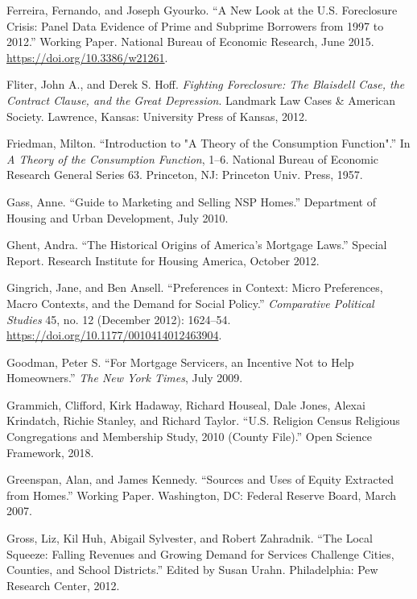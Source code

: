 \documentclass[12pt,oneside]{psthesis}
\begin{document}
\leavevmode\hypertarget{ref-ferreira2015new}{}%
Ferreira, Fernando, and Joseph Gyourko. ``A New Look at the U.S. Foreclosure Crisis: Panel Data Evidence of Prime and Subprime Borrowers from 1997 to 2012.'' Working Paper. National Bureau of Economic Research, June 2015. \url{https://doi.org/10.3386/w21261}.

\leavevmode\hypertarget{ref-fliter2012fighting}{}%
Fliter, John A., and Derek S. Hoff. \emph{Fighting Foreclosure: The Blaisdell Case, the Contract Clause, and the Great Depression}. Landmark Law Cases \& American Society. Lawrence, Kansas: University Press of Kansas, 2012.

\leavevmode\hypertarget{ref-friedman1957introduction}{}%
Friedman, Milton. ``Introduction to "A Theory of the Consumption Function".'' In \emph{A Theory of the Consumption Function}, 1--6. National Bureau of Economic Research General Series 63. Princeton, NJ: Princeton Univ. Press, 1957.

\leavevmode\hypertarget{ref-gass2010guide}{}%
Gass, Anne. ``Guide to Marketing and Selling NSP Homes.'' Department of Housing and Urban Development, July 2010.

\leavevmode\hypertarget{ref-ghent2012historical}{}%
Ghent, Andra. ``The Historical Origins of America's Mortgage Laws.'' Special Report. Research Institute for Housing America, October 2012.

\leavevmode\hypertarget{ref-gingrich2012preferences}{}%
Gingrich, Jane, and Ben Ansell. ``Preferences in Context: Micro Preferences, Macro Contexts, and the Demand for Social Policy.'' \emph{Comparative Political Studies} 45, no. 12 (December 2012): 1624--54. \url{https://doi.org/10.1177/0010414012463904}.

\leavevmode\hypertarget{ref-goodman2009mortgage}{}%
Goodman, Peter S. ``For Mortgage Servicers, an Incentive Not to Help Homeowners.'' \emph{The New York Times}, July 2009.

\leavevmode\hypertarget{ref-grammich2018religion}{}%
Grammich, Clifford, Kirk Hadaway, Richard Houseal, Dale Jones, Alexai Krindatch, Richie Stanley, and Richard Taylor. ``U.S. Religion Census Religious Congregations and Membership Study, 2010 (County File).'' Open Science Framework, 2018.

\leavevmode\hypertarget{ref-greenspan2007sources}{}%
Greenspan, Alan, and James Kennedy. ``Sources and Uses of Equity Extracted from Homes.'' Working Paper. Washington, DC: Federal Reserve Board, March 2007.

\leavevmode\hypertarget{ref-gross2012local}{}%
Gross, Liz, Kil Huh, Abigail Sylvester, and Robert Zahradnik. ``The Local Squeeze: Falling Revenues and Growing Demand for Services Challenge Cities, Counties, and School Districts.'' Edited by Susan Urahn. Philadelphia: Pew Research Center, 2012.
\end{document}
